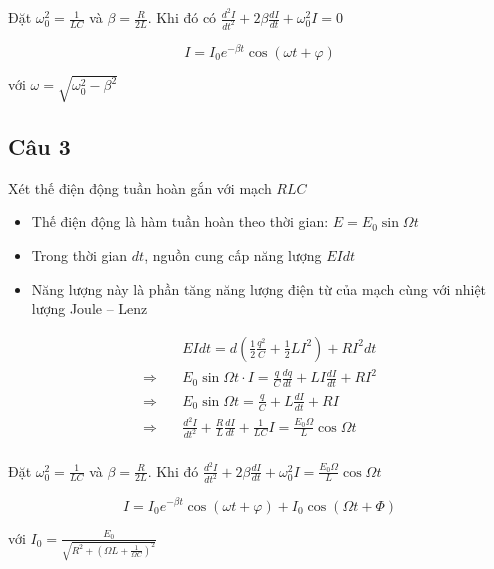 Đặt $\omega_0^2 = \frac{1}{LC}$ và $\beta = \frac{R}{2L}$. Khi đó có $\frac{d^2I}{dt^2} + 2\beta\frac{dI}{dt} + \omega_0^2 I = 0$

\begin{equation*}
  I = I_0 e^{-\beta t} \cos\left( \omega t + \varphi \right)
\end{equation*}

với $\omega = \sqrt{\omega_0^2 - \beta^2}$

\subsection{Câu 3}

Xét thế điện động tuần hoàn gắn với mạch $RLC$

\begin{itemize}
  \item Thế điện động là hàm tuần hoàn theo thời gian: $E = E_0 \sin \Omega t$
  \item Trong thời gian $dt$, nguồn cung cấp năng lượng $EIdt$
  \item Năng lượng này là phần tăng năng lượng điện từ của mạch cùng với nhiệt lượng Joule -- Lenz
\end{itemize}

\begin{align*}
  {}\quad & EIdt = d\left( \frac{1}{2}\frac{q^2}{C} + \frac{1}{2} LI^2 \right) + RI^2dt \\
  \Rightarrow\quad & E_0\sin\Omega t \cdot I = \frac{q}{C} \frac{dq}{dt} + LI\frac{dI}{dt} + RI^2 \\
  \Rightarrow\quad & E_0\sin\Omega t = \frac{q}{C} + L\frac{dI}{dt} + RI \\
  \Rightarrow\quad & \frac{d^2I}{dt^2} + \frac{R}{L} \frac{dI}{dt} + \frac{1}{LC} I = \frac{E_0 \Omega}{L} \cos \Omega t \\
\end{align*}

Đặt $\omega_0^2 = \frac{1}{LC}$ và $\beta = \frac{R}{2L}$. Khi đó $\frac{d^2I}{dt^2} + 2\beta\frac{dI}{dt} + \omega_0^2 I = \frac{E_0 \Omega}{L} \cos \Omega t$

\begin{equation*}
  I = I_0 e^{-\beta t} \cos (\omega t + \varphi) + I_0 \cos \left( \Omega t + \Phi \right)
\end{equation*}

với $I_0 = \frac{E_0}{\sqrt{R^2 + \left( \Omega L + \frac{1}{\Omega C} \right)^2}}$